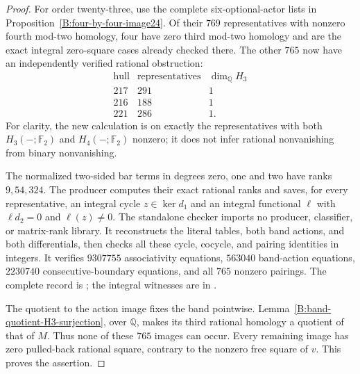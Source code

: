 \begin{proof}
For order twenty-three, use the complete six-optional-actor
lists in Proposition~\ref{B:four-by-four-image24}. Of their
$769$ representatives with nonzero fourth mod-two homology,
four have zero third mod-two homology and are the exact
integral zero-square cases already checked there. The other
$765$ now have an independently verified rational obstruction:
\[
\begin{array}{c|r|r}
 \text{hull}&\text{representatives}&\dim_{\mathbb Q}H_3\\\hline
 217&291&1\\
 216&188&1\\
 221&286&1.
\end{array}
\]
For clarity, the new calculation is on exactly the representatives
with both $H_3(-;\mathbb F_2)$ and $H_4(-;\mathbb F_2)$ nonzero;
it does not infer rational nonvanishing from binary nonvanishing.

The normalized two-sided bar terms in degrees zero, one and
two have ranks $9,54,324$. The producer
 computes their exact rational
ranks and saves, for every representative, an integral cycle
$z\in\ker d_1$ and an integral functional $\ell$ with
$\ell d_2=0$ and $\ell(z)\ne0$.
The standalone checker
 imports no producer,
classifier, or matrix-rank library. It reconstructs the literal
tables, both band actions, and both differentials, then checks
all these cycle, cocycle, and pairing identities in integers.
It verifies $9307755$ associativity equations, $563040$ band-action
equations, $2230740$ consecutive-boundary equations, and all
$765$ nonzero pairings. The complete record is
;
the integral witnesses are in
.

The quotient to the action image fixes the band pointwise.
Lemma~\ref{B:band-quotient-H3-surjection}, over $\mathbb Q$,
makes its third rational homology a quotient of that of $M$.
Thus none of these $765$ images can occur. Every remaining
image has zero pulled-back rational square, contrary to the
nonzero free square of $v$. This proves the assertion.
\end{proof}
